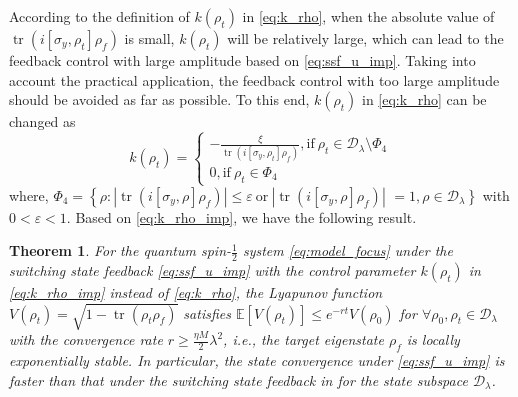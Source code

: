 \documentclass[]{elsarticle}
\newtheorem{thm}{Theorem}
\begin{document}
According to the definition of $k\left(\rho_{t}\right)$ in \eqref{eq:k_rho}, when the absolute value of $\operatorname{tr}\left(i\left[\sigma_{y}, \rho_{t}\right] \rho_f\right)$ is small, $k\left(\rho_{t}\right)$ will be relatively large, which can lead to the feedback control with large amplitude based on \eqref{eq:ssf_u_imp}. Taking into account the practical application, the feedback control with too large amplitude should be avoided as far as possible. To this end, $k\left(\rho_{t}\right)$ in \eqref{eq:k_rho} can be changed as
\begin{equation}\label{eq:k_rho_imp}
	k\left(\rho_{t}\right)=\left\{\begin{array}{l}
		-\frac{\xi}{\operatorname{tr}\left(i\left[\sigma_{y}, \rho_{t}\right] \rho_f\right)}, \text{if}~\rho_{t}\in \mathcal{D}_\lambda\setminus\Phi_4 \\
		0, \text{if}~\rho_{t}\in\Phi_4
	\end{array}\right.
\end{equation}
where, $\Phi_4=\left\{\rho:\left|\operatorname{tr}\left(i\left[\sigma_{y}, \rho\right] {\rho_f}\right)\right|\le\varepsilon~\text{or}~\left|\operatorname{tr}\left(i\left[\sigma_{y}, \rho\right] {\rho_f}\right)\right|\right.$ $\left.=1, \rho\in \mathcal{D}_\lambda\right\}$ with $0<\varepsilon<1$. Based on \eqref{eq:k_rho_imp}, we have the following result.
\begin{thm}\label{thm:exponentially_stable_ssf_imp}
	For the quantum spin-$\frac{1}{2}$ system \eqref{eq:model_focus} under the switching state feedback \eqref{eq:ssf_u_imp} with the control parameter $k\left(\rho_{t}\right)$ in \eqref{eq:k_rho_imp} instead of \eqref{eq:k_rho}, the Lyapunov function $V(\rho_{t})=\sqrt{1-\operatorname{tr}\left(\rho_t\rho_f\right)}$ satisfies $\mathbb{E}\left[V\left(\rho_{t}\right)\right]\le e^{-r t} V\left(\rho_{0}\right)$ for $\forall \rho_{0}, \rho_{t}\in\mathcal{D}_\lambda$ with the convergence rate $r\ge\frac{{\eta M}}{2}\lambda^{2}$, i.e., the target eigenstate $\rho_f$ is locally exponentially stable. In particular, the state convergence under \eqref{eq:ssf_u_imp} is faster than that under the switching state feedback in \cite{WSJZJ2021b} for the state subspace $\mathcal{D}_\lambda$.
\end{thm}
\end{document}
